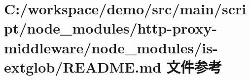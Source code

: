 \hypertarget{node__modules_2http-proxy-middleware_2node__modules_2is-extglob_2_r_e_a_d_m_e_8md}{}\section{C\+:/workspace/demo/src/main/script/node\+\_\+modules/http-\/proxy-\/middleware/node\+\_\+modules/is-\/extglob/\+R\+E\+A\+D\+ME.md 文件参考}
\label{node__modules_2http-proxy-middleware_2node__modules_2is-extglob_2_r_e_a_d_m_e_8md}
